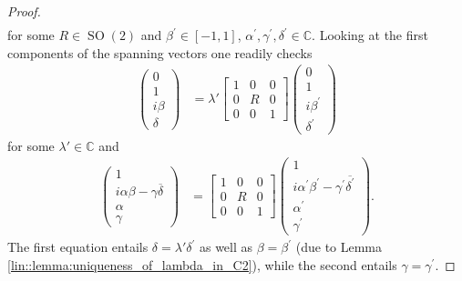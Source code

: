 \documentclass{amsart}
\newcommand{\C}{\mathbb{C}}
\DeclareMathOperator{\SO}{SO}
\begin{document}
\begin{proof}
\begin{align*}
    \end{align*}
    for some $R \in \SO(2)$ and $\beta^\prime \in [-1,1]$, $\alpha^\prime, \gamma^\prime, \delta^\prime \in \C$. Looking at the first components of the spanning vectors one readily checks
    \begin{align}
        \begin{pmatrix}
            0 \\ 1 \\ i \beta \\ \delta
        \end{pmatrix}
        &=
        \lambda' \left[\begin{array}{c|c|c}
            1& 0 & 0 \\
            \hline
            0 & R & 0 \\
            \hline 
            0 & 0 & 1
        \end{array}\right]
        \begin{pmatrix}
            0 \\ 1 \\ i \beta^\prime \\ \delta^\prime
        \end{pmatrix} 
    \end{align}
    for some $\lambda' \in \C$ and
    \begin{align}
    \label{ntg::eq:plane_lemma_case3}
        \begin{pmatrix}
            1 \\ i \alpha \beta - \gamma \overline{\delta} \\ \alpha \\ \gamma
        \end{pmatrix}
        &= 
        \left[\begin{array}{c|c|c}
            1& 0 & 0 \\
            \hline
            0 & R & 0 \\
            \hline 
            0 & 0 & 1
        \end{array}\right]
        \begin{pmatrix}
            1 \\ i \alpha^\prime \beta^\prime - \gamma^\prime \overline{\delta^\prime} \\ \alpha^\prime \\ \gamma^\prime
        \end{pmatrix}.
    \end{align}
    The first equation entails $\delta = \lambda' \delta^\prime$ as well as $\beta = \beta^\prime$ (due to Lemma \ref{lin::lemma:uniqueness_of_lambda_in_C2}), while the second entails $\gamma = \gamma^\prime$. 

\end{proof}
\end{document}
